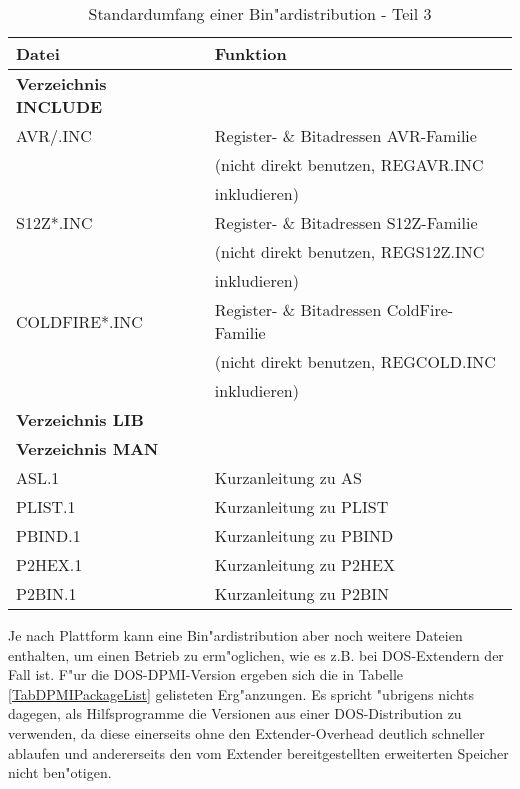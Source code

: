 \documentclass[12pt,a4paper,twoside]{report}
\begin{document}
\begin{table*}[htp]
\begin{center}\begin{tabular}{|l|l|}
\hline
Datei             & Funktion \\
\hline
\hline
{\bf Verzeichnis INCLUDE} & \\
\hline
AVR/\*.INC        & Register- \& Bitadressen AVR-Familie \\
                  & (nicht direkt benutzen, REGAVR.INC \\
                  & inkludieren) \\
S12Z\/*.INC       & Register- \& Bitadressen S12Z-Familie \\
                  & (nicht direkt benutzen, REGS12Z.INC \\
                  & inkludieren) \\
COLDFIRE\/*.INC   & Register- \& Bitadressen ColdFire-Familie \\
                  & (nicht direkt benutzen, REGCOLD.INC \\
                  & inkludieren) \\
\hline
\hline
{\bf Verzeichnis LIB} & \\
\hline
\hline
{\bf Verzeichnis MAN} & \\
\hline
ASL.1             & Kurzanleitung zu AS \\
PLIST.1           & Kurzanleitung zu PLIST \\
PBIND.1           & Kurzanleitung zu PBIND \\
P2HEX.1           & Kurzanleitung zu P2HEX \\
P2BIN.1           & Kurzanleitung zu P2BIN \\
\hline
\end{tabular}\end{center}
\caption{Standardumfang einer Bin"ardistribution - Teil 3
         \label{TabCommonPackageList3}}
\end{table*}

Je nach Plattform kann eine Bin"ardistribution aber noch weitere Dateien
enthalten, um einen Betrieb zu erm"oglichen, wie es z.B. bei DOS-Extendern
der Fall ist.  F"ur die DOS-DPMI-Version  ergeben
sich die in Tabelle \ref{TabDPMIPackageList} gelisteten Erg"anzungen.  Es
spricht "ubrigens nichts dagegen, als Hilfsprogramme die Versionen aus
einer DOS-Distribution zu verwenden, da diese einerseits ohne den
Extender-Overhead deutlich schneller ablaufen und andererseits den
vom Extender bereitgestellten erweiterten Speicher nicht ben"otigen.
\end{document}
